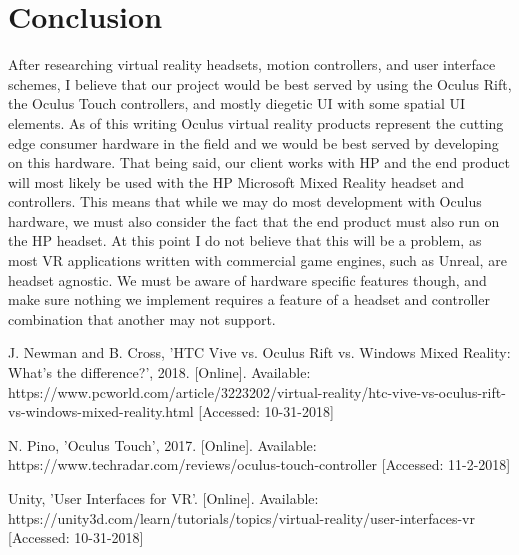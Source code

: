 \documentclass[onecolumn, draftclsnofoot,10pt, compsoc]{IEEEtran}
\begin{document}
\section{Conclusion}
After researching virtual reality headsets, motion controllers, and user interface schemes, I believe that our project would be best served by using the Oculus Rift, the Oculus Touch controllers, and mostly diegetic UI with some spatial UI elements. As of this writing Oculus virtual reality products represent the cutting edge consumer hardware in the field and we would be best served by developing on this hardware. That being said, our client works with HP and the end product will most likely be used with the HP Microsoft Mixed Reality headset and controllers. This means that while we may do most development with Oculus hardware, we must also consider the fact that the end product must also run on the HP headset. At this point I do not believe that this will be a problem, as most VR applications written with commercial game engines, such as Unreal, are headset agnostic. We must be aware of hardware specific features though, and make sure nothing we implement requires a feature of a headset and controller combination that another may not support. 

\bigskip
\begin{thebibliography}{999}

  J. Newman and B. Cross,
  'HTC Vive vs. Oculus Rift vs. Windows Mixed Reality: What's the difference?',
  2018.
  [Online].
  Available: https://www.pcworld.com/article/3223202/virtual-reality/htc-vive-vs-oculus-rift-vs-windows-mixed-reality.html
  [Accessed: 10-31-2018]

  N. Pino,
  'Oculus Touch',
  2017.
  [Online].
  Available: https://www.techradar.com/reviews/oculus-touch-controller
  [Accessed: 11-2-2018]

  Unity,
  'User Interfaces for VR'.
  [Online].
  Available: https://unity3d.com/learn/tutorials/topics/virtual-reality/user-interfaces-vr
  [Accessed: 10-31-2018]
 
\end{thebibliography}
\end{document}
